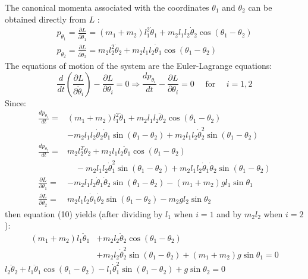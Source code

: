 \documentclass[12pt]{article}
\begin{document}
	The canonical momenta associated with the coordinates $\theta_{1}$ and $\theta_{2}$ can be obtained directly from $L$ :
	$$
	\begin{array}{l}
	p_{\theta_{1}}=\frac{\partial L}{\partial \dot{\theta}_{1}}=\left(m_{1}+m_{2}\right) l_{1}^{2} \dot{\theta}_{1}+m_{2} l_{1} l_{2} \dot{\theta}_{2} \cos \left(\theta_{1}-\theta_{2}\right) \\
	p_{\theta_{2}}=\frac{\partial L}{\partial \dot{\theta}_{2}}=m_{2} l_{2}^{2} \dot{\theta}_{2}+m_{2} l_{1} l_{2} \dot{\theta}_{1} \cos \left(\theta_{1}-\theta_{2}\right)
	\end{array}
	$$
	The equations of motion of the system are the Euler-Lagrange equations:
	$$
	\frac{d}{d t}\left(\frac{\partial L}{\partial \dot{\theta}_{i}}\right)-\frac{\partial L}{\partial \theta_{i}}=0 \Longrightarrow \frac{d p_{\theta_{i}}}{d t}-\frac{\partial L}{\partial \theta_{i}}=0 \quad \text { for } \quad i=1,2
	$$
	Since:
	$$
	\begin{aligned}
	\frac{d p_{\theta_{1}}}{d t}=&\left(m_{1}+m_{2}\right) l_{1}^{2} \ddot{\theta}_{1}+m_{2} l_{1} l_{2} \ddot{\theta}_{2} \cos \left(\theta_{1}-\theta_{2}\right) \\
	&-m_{2} l_{1} l_{2} \dot{\theta}_{2} \dot{\theta}_{1} \sin \left(\theta_{1}-\theta_{2}\right)+m_{2} l_{1} l_{2} \dot{\theta}_{2}^{2} \sin \left(\theta_{1}-\theta_{2}\right) \\
	\frac{d p_{\theta_{2}}}{d t}=& m_{2} l_{2}^{2} \ddot{\theta}_{2}+m_{2} l_{1} l_{2} \ddot{\theta}_{1} \cos \left(\theta_{1}-\theta_{2}\right) \\
	& \quad-m_{2} l_{1} l_{2} \dot{\theta}_{1}^{2} \sin \left(\theta_{1}-\theta_{2}\right)+m_{2} l_{1} l_{2} \dot{\theta}_{1} \dot{\theta}_{2} \sin \left(\theta_{1}-\theta_{2}\right) \\
	\frac{\partial L}{\partial \theta_{1}}=&-m_{2} l_{1} l_{2} \dot{\theta}_{1} \dot{\theta}_{2} \sin \left(\theta_{1}-\theta_{2}\right)-\left(m_{1}+m_{2}\right) g l_{1} \sin \theta_{1} \\
	\frac{\partial L}{\partial \theta_{2}}=& m_{2} l_{1} l_{2} \dot{\theta}_{1} \dot{\theta}_{2} \sin \left(\theta_{1}-\theta_{2}\right)-m_{2} g l_{2} \sin \theta_{2}
	\end{aligned}
	$$
	then equation (10) yields (after dividing by $l_{1}$ when $i=1$ and by $m_{2} l_{2}$ when $i=2$ ):
	$$
	\begin{aligned}
	\left(m_{1}+m_{2}\right) l_{1} \ddot{\theta}_{1} &+m_{2} l_{2} \ddot{\theta}_{2} \cos \left(\theta_{1}-\theta_{2}\right) \\
	&+m_{2} l_{2} \dot{\theta}_{2}^{2} \sin \left(\theta_{1}-\theta_{2}\right)+\left(m_{1}+m_{2}\right) g \sin \theta_{1}=0
	\end{aligned}
	$$
	$l_{2} \ddot{\theta}_{2}+l_{1} \ddot{\theta}_{1} \cos \left(\theta_{1}-\theta_{2}\right)-l_{1} \dot{\theta}_{1}^{2} \sin \left(\theta_{1}-\theta_{2}\right)+g \sin \theta_{2}=0$
	
\end{document}
